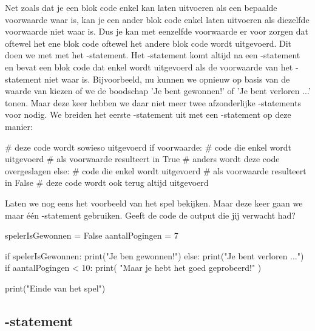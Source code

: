 Net zoals dat je een blok code enkel kan laten uitvoeren als een bepaalde voorwaarde waar is,
kan je een ander blok code enkel laten uitvoeren als diezelfde voorwaarde niet waar is.
Dus je kan met eenzelfde voorwaarde er voor zorgen dat oftewel het ene blok code oftewel het andere blok code wordt uitgevoerd.
Dit doen we met met het -statement.
Het -statement komt altijd na een -statement
en bevat een blok code dat enkel wordt uitgevoerd als de voorwaarde van het -statement niet waar is.
Bijvoorbeeld, nu kunnen we opnieuw op basis van de waarde van 
kiezen of we de boodschap 'Je bent gewonnen!' of 'Je bent verloren ...' tonen.
Maar deze keer hebben we daar niet meer twee afzonderlijke -statements voor nodig.
We breiden het eerste -statement uit met een -statement op deze manier:
\begin{pyEnv}
# deze code wordt sowieso uitgevoerd
if voorwaarde:
	# code die enkel wordt uitgevoerd
	# als voorwaarde resulteert in True
	# anders wordt deze code overgeslagen
else:
	# code die enkel wordt uitgevoerd
	# als voorwaarde resulteert in False
# deze code wordt ook terug altijd uitgevoerd
\end{pyEnv}

\begin{letsTryOut}
	Laten we nog eens het voorbeeld van het spel bekijken.
	Maar deze keer gaan we maar \'e\'en -statement gebruiken.
	\newline
	Geeft de code de output die jij verwacht had?
\begin{pyEnv}
spelerIsGewonnen = False
aantalPogingen = 7

if spelerIsGewonnen:
	print("Je ben gewonnen!")
else:
	print("Je bent verloren ...")
	if aantalPogingen < 10:
		print(
			"Maar je hebt het goed geprobeerd!"
		)

print("Einde van het spel")
\end{pyEnv}
\end{letsTryOut}

\subsection{-statement}

